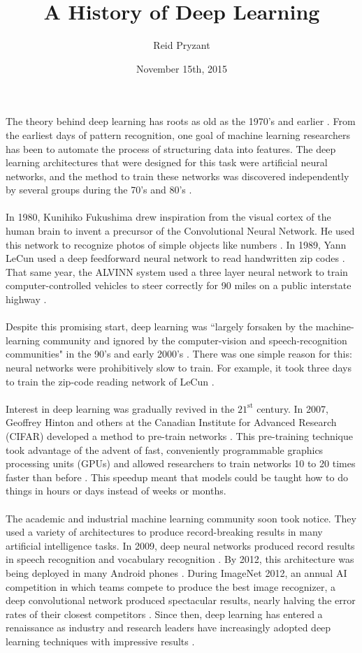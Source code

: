 \documentclass[a4paper]{article}
\title{A History of Deep Learning}
\author{Reid Pryzant}
\date{November 15th, 2015}
\begin{document}
\maketitle
\noindent The theory behind deep learning has roots as old as the 1970's and earlier \cite{mitchell}. From the earliest days of pattern recognition, one goal of machine learning researchers has been to automate the process of structuring data into features. The deep learning architectures that were designed for this task were artificial neural networks, and the method to train these networks was discovered independently by several groups during the 70's and 80's \cite{lecun15}. 
\\ \\
\noindent In 1980, Kunihiko Fukushima drew inspiration from the visual cortex of the human brain to invent a precursor of the Convolutional Neural Network. He used this network to recognize photos of simple objects like numbers \cite{fukushima}. In 1989, Yann LeCun used a deep feedforward neural network to read handwritten zip codes \cite{lecun89}. That same year, the ALVINN system used a three layer neural network to train computer-controlled vehicles to steer correctly for 90 miles on a public interstate highway \cite{pomerleau}. 
\\ \\
\noindent Despite this promising start, deep learning was ``largely forsaken by the machine-learning community and ignored by the computer-vision and speech-recognition communities" in the 90's and early 2000's \cite{lecun15}. There was one simple reason for this: neural networks were prohibitively slow to train. For example, it took three days to train the zip-code reading network of LeCun \cite{lecun89}.
\\ \\
\noindent Interest in deep learning was gradually revived in the $21^{\mathrm{st}}$ century. In 2007, Geoffrey Hinton and others at the Canadian Institute for Advanced Research (CIFAR) developed a method to pre-train networks \cite{hinton07}. This pre-training technique took advantage of the advent of fast, conveniently programmable graphics processing units (GPUs) and allowed researchers to train networks 10 to 20 times faster than before \cite{raina09}. This speedup meant that models could be taught how to do things in hours or days instead of weeks or months. 
\\ \\
\noindent The academic and industrial machine learning community soon took notice. They used a variety of architectures to produce record-breaking results in many artificial intelligence tasks. In 2009, deep neural networks produced record results in speech recognition and vocabulary recognition \cite{dahl}. By 2012, this architecture was being deployed in many Android phones \cite{lecun15}. During ImageNet 2012, an annual AI competition in which teams compete to produce the best image recognizer, a deep convolutional network produced spectacular results, nearly halving the error rates of their closest competitors \cite{krizhevsky}. Since then, deep learning has entered a renaissance as industry and research leaders have increasingly adopted deep learning techniques with impressive results  \cite{ibm}.
\end{document}

